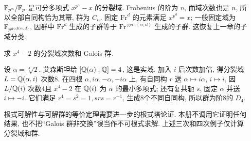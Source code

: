 $\mathbb F_{p^n}/\mathbb F_p$ 是可分多项式 $x^{p^n}-x$ 的分裂域. Frobenius 的阶为 $n$, 而域次数也是 $n$, 所以全部自同构恰为其幂, 群为 $C_n$. 固定 $\mathrm{Fr}^d$ 的元素满足 $x^{p^d}=x$; 一般固定域为 $\mathbb F_{p^{\gcd(n,d)}}$, 因群中 $\mathrm{Fr}^d$ 生成的子群等于 $\mathrm{Fr}^{\gcd(n,d)}$ 生成的子群. 这恢复上一章的子域分类.
\begin{exercise}求 $x^4-2$ 的分裂域次数和 Galois 群.\end{exercise}
\begin{solution}
设 $\alpha=\sqrt[4]2$. 艾森斯坦给 $[\mathbb Q(\alpha):\mathbb Q]=4$, 这是实域. 加入 $i$ 后次数加倍, 得分裂域 $L=\mathbb Q(\alpha,i)$ 次数8. 在四根 $\alpha,i\alpha,-\alpha,-i\alpha$ 上, 有自同构 $r$ 送 $\alpha\mapsto i\alpha$, $i\mapsto i$, 因 $L/\mathbb Q(i)$ 次数4且 $x^4-2$ 在 $\mathbb Q(i)$ 为 $\alpha$ 的最小多项式; 还有复共轭 $s$, 固定 $\alpha$ 并送 $i\mapsto-i$. 它们满足 $r^4=s^2=1,srs=r^{-1}$, 生成8个不同自同构, 所以群为阶8的 $D_4$.
\end{solution}
\begin{remark}
根式可解性与可解群的等价定理需要进一步的根式塔论证. 本册不调用它证明任何结果, 也不把“Galois 群非交换”误当作不可根式求解. 上述三次和四次例子仅计算分裂域和群.
\end{remark}
